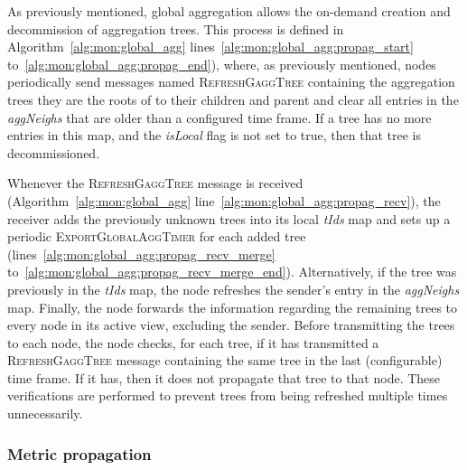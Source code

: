 As previously mentioned, global aggregation allows the on-demand creation and decommission of aggregation trees. This process is defined in Algorithm~\ref{alg:mon:global_agg} lines~\ref{alg:mon:global_agg:propag_start} to~\ref{alg:mon:global_agg:propag_end}), where, as previously mentioned, nodes periodically send messages named \textsc{RefreshGaggTree} containing the aggregation trees they are the roots of to their children and parent and clear all entries in the \textit{aggNeighs} that are older than a configured time frame. If a tree has no more entries in this map, and the \textit{isLocal} flag is not set to true, then that tree is decommissioned.


Whenever the \textsc{RefreshGaggTree} message is received (Algorithm~\ref{alg:mon:global_agg} line~\ref{alg:mon:global_agg:propag_recv}), the receiver adds the previously unknown trees into its local \textit{tIds} map and sets up a periodic \textsc{ExportGlobalAggTimer} for each added tree (lines~\ref{alg:mon:global_agg:propag_recv_merge} to~\ref{alg:mon:global_agg:propag_recv_merge_end}). Alternatively, if the tree was previously in the \textit{tIds} map, the node refreshes the sender's entry in the \textit{aggNeighs} map. Finally, the node forwards the information regarding the remaining trees to every node in its active view, excluding the sender. Before transmitting the trees to each node, the node checks, for each tree, if it has transmitted a \textsc{RefreshGaggTree} message containing the same tree in the last (configurable) time frame. If it has, then it does not propagate that tree to that node. These verifications are performed to prevent trees from being refreshed multiple times unnecessarily. 

\subsubsection{Metric propagation}

